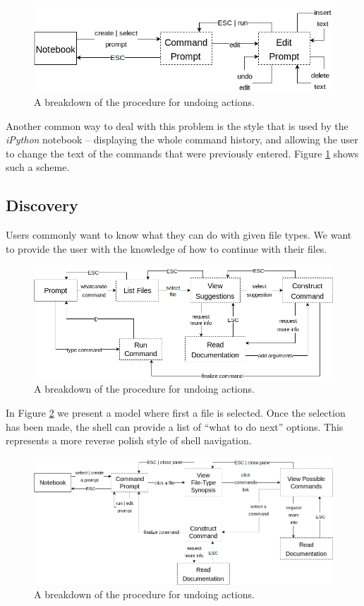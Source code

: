 \begin{figure}[H]
  \centering
  \includegraphics[width=0.8\linewidth]{figures/alternatives/undo_c.png}
  \caption{A breakdown of the procedure for undoing actions.}
  \label{fig:undoc}
\end{figure}

Another common way to deal with this problem is the style that is used by the
\emph{iPython} notebook \--- displaying the whole command history, and allowing
the user to change the text of the commands that were previously entered. Figure
\ref{fig:undoc} shows such a scheme.

\subsection{Discovery}

Users commonly want to know what they can do with given file types. We want to
provide the user with the knowledge of how to continue with their files.

\begin{figure}[H]
  \centering
  \includegraphics[width=0.8\linewidth]{figures/alternatives/file_a.png}
  \caption{A breakdown of the procedure for undoing actions.}
  \label{fig:disca}
\end{figure}

In Figure \ref{fig:disca} we present a model where first a file is selected. Once
the selection has been made, the shell can provide a list of ``what to do next''
options. This represents a more reverse polish style of shell navigation.

\begin{figure}[H]
  \centering
  \includegraphics[width=\linewidth]{figures/alternatives/file_b.png}
  \caption{A breakdown of the procedure for undoing actions.}
  \label{fig:discb}
\end{figure}

